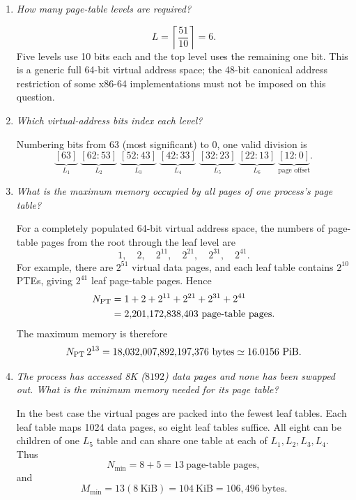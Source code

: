 \begin{enumerate}
\item[(a)] \emph{How many page-table levels are required?}

\[
 L=\left\lceil\frac{51}{10}\right\rceil=6.
\]
Five levels use 10 bits each and the top level uses the remaining one bit.
This is a generic full 64-bit virtual address space; the 48-bit canonical
address restriction of some x86-64 implementations must not be imposed on
this question.

\item[(b)] \emph{Which virtual-address bits index each level?}

Numbering bits from 63 (most significant) to 0, one valid division is
\[
\underbrace{[63]}_{L_1}\;
\underbrace{[62:53]}_{L_2}\;
\underbrace{[52:43]}_{L_3}\;
\underbrace{[42:33]}_{L_4}\;
\underbrace{[32:23]}_{L_5}\;
\underbrace{[22:13]}_{L_6}\;
\underbrace{[12:0]}_{\mbox{page offset}} .
\]

\item[(c)] \emph{What is the maximum memory occupied by all pages of one
process's page table?}

For a completely populated 64-bit virtual address space, the numbers of
page-table pages from the root through the leaf level are
\[
1,\quad 2,\quad 2^{11},\quad 2^{21},\quad 2^{31},\quad 2^{41}.
\]
For example, there are \(2^{51}\) virtual data pages, and each leaf table
contains \(2^{10}\) PTEs, giving \(2^{41}\) leaf page-table pages.  Hence
\[
\begin{split}
N_{\rm PT}
 &= 1+2+2^{11}+2^{21}+2^{31}+2^{41}\\
 &=2{,}201{,}172{,}838{,}403\ \mbox{page-table pages}.
\end{split}
\]
The maximum memory is therefore
\[
N_{\rm PT}\,2^{13}
=18{,}032{,}007{,}892{,}197{,}376\ \mbox{bytes}
\mathrel{\simeq}16.0156\ \mbox{PiB}.
\]

\item[(d)] \emph{The process has accessed 8K (\(8192\)) data pages and none
has been swapped out.  What is the minimum memory needed for its page table?}

In the best case the virtual pages are packed into the fewest leaf tables.
Each leaf table maps 1024 data pages, so eight leaf tables suffice.  All
eight can be children of one \(L_5\) table and can share one table at each
of \(L_1,L_2,L_3,L_4\).  Thus
\[
N_{\min}=8+5=13\ \mbox{page-table pages},
\]
and
\[
M_{\min}=13(8\ \mbox{KiB})=104\ \mbox{KiB}
=106{,}496\ \mbox{bytes}.
\]


\end{enumerate}
